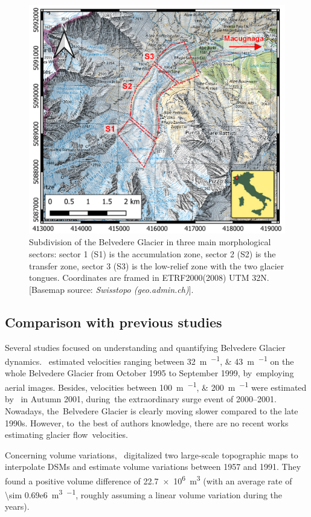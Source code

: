 \begin{figure}
    \centering
    \includegraphics[width=.7\textwidth]{belvedereMapSect}
	\caption{Subdivision of the Belvedere Glacier in three main morphological sectors: sector 1 (S1) is the accumulation zone, sector 2 (S2) is the transfer zone, sector 3 (S3) is the low-relief zone with the two glacier tongues. Coordinates are framed in ETRF2000(2008) UTM 32N. [Basemap source: \textit{Swisstopo (geo.admin.ch)}].}
	\label{fig:3:sectors}	
\end{figure}	

\subsection{Comparison with previous studies}\label{sec:3:discussion:prevstudies}

Several studies focused on understanding and quantifying Belvedere Glacier
dynamics.~\cite{Kaab2005} estimated velocities ranging between
\SIlist{32;43}{\meter\per\year} on the whole Belvedere Glacier from October 1995 to
September 1999, by~employing aerial images.
Besides, velocities between \SIlist{100;200}{\meter\per\year} were estimated
by~\cite{Kaab2005} in Autumn 2001, during~the extraordinary surge event of 2000--2001.
Nowadays, the~Belvedere Glacier is clearly moving slower compared to the late 1990s.
However, to~the best of authors knowledge, there are no recent works estimating glacier
flow~velocities.

Concerning volume variations,~\cite{Diolaiuti2003} digitalized two large-scale
topographic maps to interpolate DSMs and estimate volume variations between 1957 and
1991.
They found a positive volume difference of
\SI[retain-explicit-plus]{+22.7e6}{\cubic\meter} (with an average rate of \SI{\sim
    0.69e6}{\cubic\m\per\year}, roughly assuming a linear volume variation during the
years).

